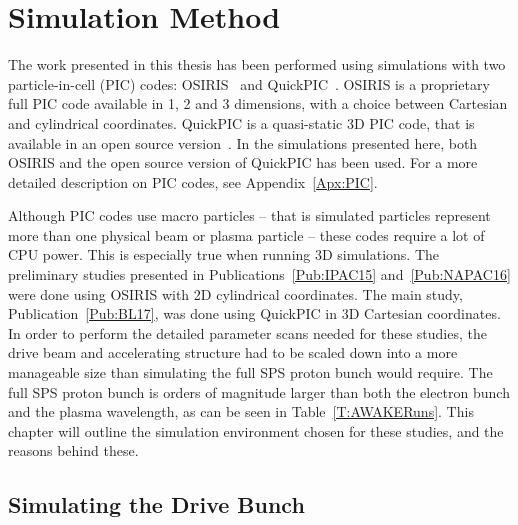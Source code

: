 %
%

\chapter{Simulation Method}
\label{Ch:SimS}

The work presented in this thesis has been performed using simulations with two particle-in-cell (PIC) codes:
OSIRIS~\cite{fonseca:2002} and QuickPIC~\cite{an:2013, huang:2006}.
OSIRIS is a proprietary full PIC code available in 1, 2 and 3 dimensions, with a choice between Cartesian and cylindrical coordinates.
QuickPIC is a quasi-static 3D PIC code, that is available in an open source version~\cite{add:quickpic:web}.
In the simulations presented here, both OSIRIS and the open source version of QuickPIC has been used.
For a more detailed description on PIC codes, see Appendix~\ref{Apx:PIC}.

Although PIC codes use macro particles -- that is simulated particles represent more than one physical beam or plasma particle -- these codes require a lot of CPU power.
This is especially true when running 3D simulations.
The preliminary studies presented in Publications~\ref{Pub:IPAC15} and~\ref{Pub:NAPAC16} were done using OSIRIS with 2D cylindrical coordinates.
The main study, Publication~\ref{Pub:BL17}, was done using QuickPIC in 3D Cartesian coordinates.
In order to perform the detailed parameter scans needed for these studies, the drive beam and accelerating structure had to be scaled down into a more manageable size than simulating the full SPS proton bunch would require.
The full SPS proton bunch is orders of magnitude larger than both the electron bunch and the plasma wavelength, as can be seen in Table~\ref{T:AWAKERuns}.
This chapter will outline the simulation environment chosen for these studies, and the reasons behind these.

\section{Simulating the Drive Bunch}
\label{Sim:PBeam}

